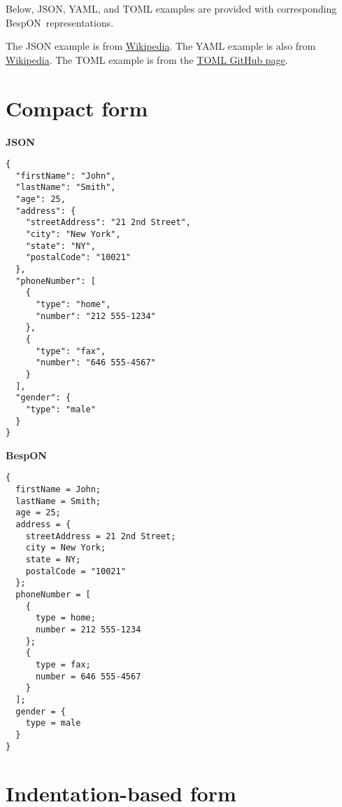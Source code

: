 \documentclass[11pt]{article}
\newcommand{\bespon}{BespON}
\begin{document}
{{\pagebreak
\begin{appendices}

Below, JSON, YAML, and TOML examples are provided with corresponding \bespon\ representations.

The JSON example is from \href{https://en.wikipedia.org/wiki/JSON}{Wikipedia}.  The YAML example is also from \href{https://en.wikipedia.org/wiki/YAML}{Wikipedia}.  The TOML example is from the \href{https://github.com/toml-lang/toml}{TOML GitHub page}.


\section{Compact form}


\begin{tcolorbox}{}
\begin{multicols}{2}

\centering \textbf{JSON}
\begin{Verbatim}[formatcom=\color{DarkGreen}]
{
  "firstName": "John",
  "lastName": "Smith",
  "age": 25,
  "address": {
    "streetAddress": "21 2nd Street",
    "city": "New York",
    "state": "NY",
    "postalCode": "10021"
  },
  "phoneNumber": [
    {
      "type": "home",
      "number": "212 555-1234"
    },
    {
      "type": "fax",
      "number": "646 555-4567"
    }
  ],
  "gender": {
    "type": "male"
  }
}
\end{Verbatim}
\columnbreak
\centering \textbf{BespON}

\begin{Verbatim}
{
  firstName = John;
  lastName = Smith;
  age = 25;
  address = {
    streetAddress = 21 2nd Street;
    city = New York;
    state = NY;
    postalCode = "10021"
  };
  phoneNumber = [
    {
      type = home;
      number = 212 555-1234
    };
    {
      type = fax;
      number = 646 555-4567
    }
  ];
  gender = {
    type = male
  }
}
\end{Verbatim}
\end{multicols}
\end{tcolorbox}



\section{Indentation-based form}


\begin{tcolorbox}{}
\begin{multicols}{2}


\end{multicols}
\end{tcolorbox}
\end{appendices}}}
\end{document}
